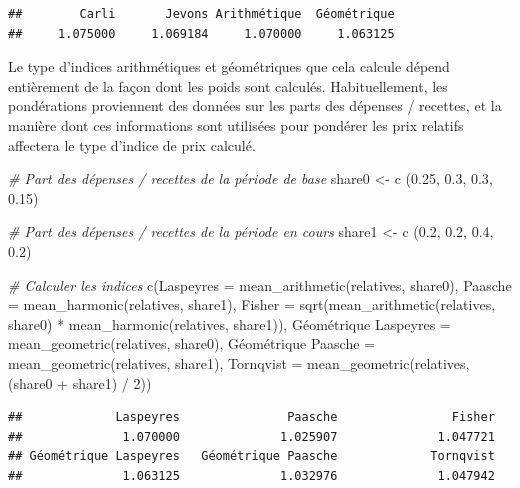 \documentclass[
]{article}
\newenvironment{Shaded}{\begin{snugshade}}{\end{snugshade}}
\newcommand{\AttributeTok}[1]{\textcolor[rgb]{0.77,0.63,0.00}{#1}}
\newcommand{\CommentTok}[1]{\textcolor[rgb]{0.56,0.35,0.01}{\textit{#1}}}
\newcommand{\DecValTok}[1]{\textcolor[rgb]{0.00,0.00,0.81}{#1}}
\newcommand{\FloatTok}[1]{\textcolor[rgb]{0.00,0.00,0.81}{#1}}
\newcommand{\FunctionTok}[1]{\textcolor[rgb]{0.00,0.00,0.00}{#1}}
\newcommand{\NormalTok}[1]{#1}
\newcommand{\OtherTok}[1]{\textcolor[rgb]{0.56,0.35,0.01}{#1}}
\newcommand{\SpecialCharTok}[1]{\textcolor[rgb]{0.00,0.00,0.00}{#1}}
\newcommand{\StringTok}[1]{\textcolor[rgb]{0.31,0.60,0.02}{#1}}
\begin{document}
\begin{verbatim}
##        Carli       Jevons Arithmétique  Géométrique 
##     1.075000     1.069184     1.070000     1.063125
\end{verbatim}

Le type d'indices arithmétiques et géométriques que cela calcule dépend entièrement de la façon dont les poids sont calculés. Habituellement, les pondérations proviennent des données sur les parts des dépenses / recettes, et la manière dont ces informations sont utilisées pour pondérer les prix relatifs affectera le type d'indice de prix calculé.

\begin{Shaded}
\begin{Highlighting}[]
\CommentTok{\# Part des dépenses / recettes de la période de base}
\NormalTok{share0 }\OtherTok{\textless{}{-}} \FunctionTok{c}\NormalTok{ (}\FloatTok{0.25}\NormalTok{, }\FloatTok{0.3}\NormalTok{, }\FloatTok{0.3}\NormalTok{, }\FloatTok{0.15}\NormalTok{)}

\CommentTok{\# Part des dépenses / recettes de la période en cours}
\NormalTok{share1 }\OtherTok{\textless{}{-}} \FunctionTok{c}\NormalTok{ (}\FloatTok{0.2}\NormalTok{, }\FloatTok{0.2}\NormalTok{, }\FloatTok{0.4}\NormalTok{, }\FloatTok{0.2}\NormalTok{)}

\CommentTok{\# Calculer les indices}
\FunctionTok{c}\NormalTok{(}\AttributeTok{Laspeyres =} \FunctionTok{mean\_arithmetic}\NormalTok{(relatives, share0),}
  \AttributeTok{Paasche =} \FunctionTok{mean\_harmonic}\NormalTok{(relatives, share1),}
  \AttributeTok{Fisher =} \FunctionTok{sqrt}\NormalTok{(}\FunctionTok{mean\_arithmetic}\NormalTok{(relatives, share0) }\SpecialCharTok{*} 
                  \FunctionTok{mean\_harmonic}\NormalTok{(relatives, share1)),}
  \StringTok{\textasciigrave{}}\AttributeTok{Géométrique Laspeyres}\StringTok{\textasciigrave{}} \OtherTok{=} \FunctionTok{mean\_geometric}\NormalTok{(relatives, share0),}
  \StringTok{\textasciigrave{}}\AttributeTok{Géométrique Paasche}\StringTok{\textasciigrave{}} \OtherTok{=} \FunctionTok{mean\_geometric}\NormalTok{(relatives, share1),}
  \AttributeTok{Tornqvist =} \FunctionTok{mean\_geometric}\NormalTok{(relatives, (share0 }\SpecialCharTok{+}\NormalTok{ share1) }\SpecialCharTok{/} \DecValTok{2}\NormalTok{))}
\end{Highlighting}
\end{Shaded}

\begin{verbatim}
##             Laspeyres               Paasche                Fisher 
##              1.070000              1.025907              1.047721 
## Géométrique Laspeyres   Géométrique Paasche             Tornqvist 
##              1.063125              1.032976              1.047942
\end{verbatim}
\end{document}
